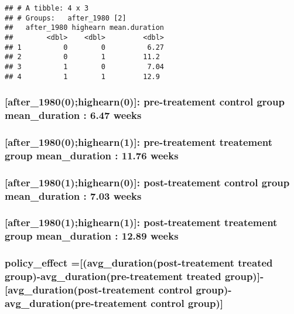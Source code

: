 \documentclass[
]{article}
\begin{document}
\begin{verbatim}
## # A tibble: 4 x 3
## # Groups:   after_1980 [2]
##   after_1980 highearn mean.duration
##        <dbl>    <dbl>         <dbl>
## 1          0        0          6.27
## 2          0        1         11.2 
## 3          1        0          7.04
## 4          1        1         12.9
\end{verbatim}

\subsubsection{{[}after\_1980(0);highearn(0){]}: pre-treatement control
group mean\_duration : 6.47
weeks}\label{after_19800highearn0-pre-treatement-control-group-mean_duration-6.47-weeks}

\subsubsection{{[}after\_1980(0);highearn(1){]}: pre-treatement
treatement group mean\_duration : 11.76
weeks}\label{after_19800highearn1-pre-treatement-treatement-group-mean_duration-11.76-weeks}

\subsubsection{{[}after\_1980(1);highearn(0){]}: post-treatement control
group mean\_duration : 7.03
weeks}\label{after_19801highearn0-post-treatement-control-group-mean_duration-7.03-weeks}

\subsubsection{{[}after\_1980(1);highearn(1){]}: post-treatement
treatement group mean\_duration : 12.89
weeks}\label{after_19801highearn1-post-treatement-treatement-group-mean_duration-12.89-weeks}

\subsubsection{policy\_effect ={[}(avg\_duration(post-treatement treated
group)-avg\_duration(pre-treatement treated
group){]}-{[}avg\_duration(post-treatement control
group)-avg\_duration(pre-treatement control
group){]}}\label{policy_effect-avg_durationpost-treatement-treated-group-avg_durationpre-treatement-treated-group-avg_durationpost-treatement-control-group-avg_durationpre-treatement-control-group}
\end{document}
